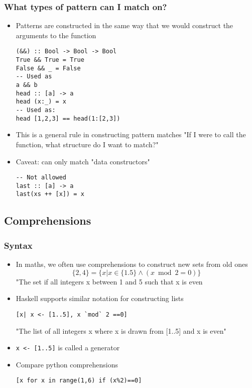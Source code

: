 \documentclass{article}[18pt]
\begin{document}
\subsubsection{What types of pattern can I match on?}
\begin{itemize}
	\item Patterns are constructed in the same way that we would construct the arguments to the function
\begin{verbatim}
(&&) :: Bool -> Bool -> Bool
True && True = True
False && _ = False
-- Used as
a && b
head :: [a] -> a
head (x:_) = x
-- Used as:
head [1,2,3] == head(1:[2,3])
\end{verbatim}
	\item This is a general rule in constructing pattern matches "If I were to call the function, what structure do I want to match?"
	\item Caveat: can only match "data constructors"
\begin{verbatim}
-- Not allowed
last :: [a] -> a
last(xs ++ [x]) = x
\end{verbatim}
\end{itemize}
\subsection{Comprehensions}
\subsubsection{Syntax}
\begin{itemize}
	\item In maths, we often use comprehensions to construct new sets from old ones
\[
\{2,4\}=\{x | x \in\{1.5\} \wedge(x \bmod 2=0)\}
\]
"The set if all integers x between 1 and 5 such that x is even
	\item Haskell supports similar notation for constructing lists
\begin{verbatim}
[x| x <- [1..5], x `mod` 2 ==0]
\end{verbatim}
"The list of all integers x where x is drawn from [1..5] and x is even"
	\item \texttt{x <- [1..5]} is called a generator
	\item Compare python comprehensions
\begin{verbatim}
[x for x in range(1,6) if (x%2)==0]
\end{verbatim}
\end{itemize}
\end{document}
